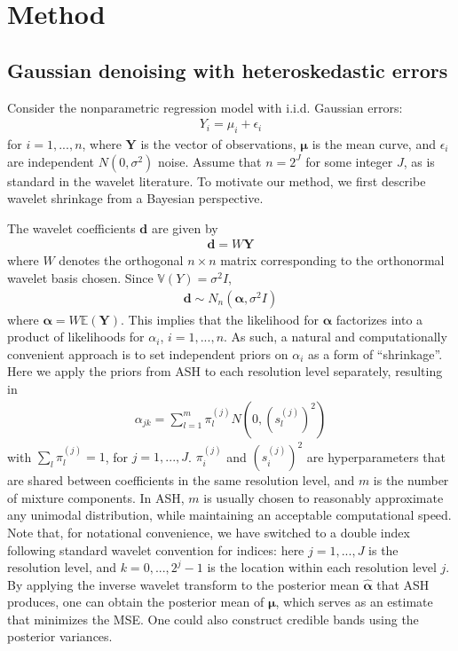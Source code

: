 \documentclass[12pt]{article}
\newcommand{\Ga}{\alpha}
\newcommand{\Ge}{\epsilon}
\newcommand{\s}{\sigma}
\begin{document}
\section{Method}
\subsection{Gaussian denoising with heteroskedastic errors}
Consider the nonparametric regression model with i.i.d. Gaussian errors:
\begin{eqnarray}\label{eq:1d gaussian model}
Y_i=\mu_i+\Ge_i
\end{eqnarray}
for $i=1,...,n$, where $\bm{Y}$ is the vector of observations, $\bm{\mu}$ is the mean curve, and $\Ge_i$ are independent $N(0,\s^2)$ noise. Assume that $n=2^J$ for some integer $J$, as is standard in the wavelet literature. To motivate our method, we first describe wavelet shrinkage from a Bayesian perspective.

The wavelet coefficients $\bm{d}$ are given by
\begin{eqnarray}
\bm{d}=W\bm{Y}
\end{eqnarray}
where $W$ denotes the orthogonal $n\times n$ matrix corresponding to the orthonormal wavelet basis chosen.
Since $\mathbb{V}(Y)=\s^2I$,
\begin{eqnarray}\label{eq:waveletcoef}
\bm{d}\sim N_n(\bm{\Ga},\s^2I)
\end{eqnarray}
where $\bm{\Ga}=W\mathbb{E}(\bm{Y})$. This implies that the likelihood for $\bm{\Ga}$ factorizes into a product of likelihoods for $\Ga_i$, $i=1,...,n$. As such, a natural and computationally convenient approach is to set independent priors on $\Ga_i$ as a form of ``shrinkage''. Here we apply the priors from ASH to each resolution level separately, resulting in
\begin{eqnarray}\label{eq:ashprior}
\Ga_{jk}=\sum_{l=1}^m \pi_l^{(j)} N(0,(s_l^{(j)})^2)
\end{eqnarray}
with $\sum_l \pi_l^{(j)}=1$, for $j=1,...,J$. $\pi_i^{(j)}$ and $(s_i^{(j)})^2$ are hyperparameters that are shared between coefficients in the same resolution level, and $m$ is the number of mixture components. In ASH, $m$ is usually chosen to reasonably approximate any unimodal distribution, while maintaining an acceptable computational speed. Note that, for notational convenience, we have switched to a double index following standard wavelet convention for indices: here $j=1,...,J$ is the resolution level, and $k=0,...,2^j-1$ is the location within each resolution level $j$. By applying the inverse wavelet transform to the posterior mean $\hat{\bm{\Ga}}$ that ASH produces, one can obtain the posterior mean of $\bm{\mu}$, which serves as an estimate that minimizes the MSE. One could also construct credible bands using the posterior variances.
\end{document}
